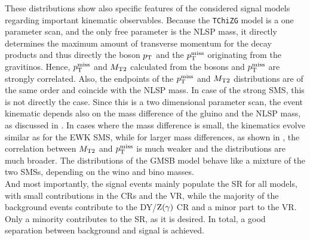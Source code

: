 These distributions show also specific features of the considered signal models regarding important kinematic observables. Because the \texttt{TChiZG} model is a one parameter scan, and the only free parameter is the NLSP mass, it directly determines the maximum amount of transverse momentum for the decay products and thus directly the boson $p_{\mathrm{T}}$ and the $p_{\mathrm{T}}^\text{miss}$ originating from the gravitinos. Hence, $p_{\mathrm{T}}^\text{miss}$ and $M_{\mathrm{T2}}$ calculated from the bosons and $p_{\mathrm{T}}^\text{miss}$ are strongly correlated. Also, the endpoints of the $p_{\mathrm{T}}^\text{miss}$ and $M_{\mathrm{T2}}$ distributions are of the same order and coincide with the NLSP mass. In case of the strong SMS, this is not directly the case. Since this is a two dimensional parameter scan, the event kinematic depends also on the mass difference of the gluino and the NLSP mass, as discussed in . In cases where the mass difference is small, the kinematics evolve similar as for the EWK SMS, while for larger mass differences, as shown in , the correlation between $M_{\mathrm{T2}}$ and $p_{\mathrm{T}}^\text{miss}$ is much weaker and the distributions are much broader. The distributions of the GMSB model behave like a mixture of the two SMSs, depending on the wino and bino masses.\\
And most importantly, the signal events mainly populate the SR for all models, with small contributions in the CRs and the VR, while the majority of the background events contribute to the DY/$\mathrm{Z}(\gamma)$ CR and a minor part to the VR. Only a minority contributes to the SR, as it is desired. In total, a good separation between background and signal is achieved.

